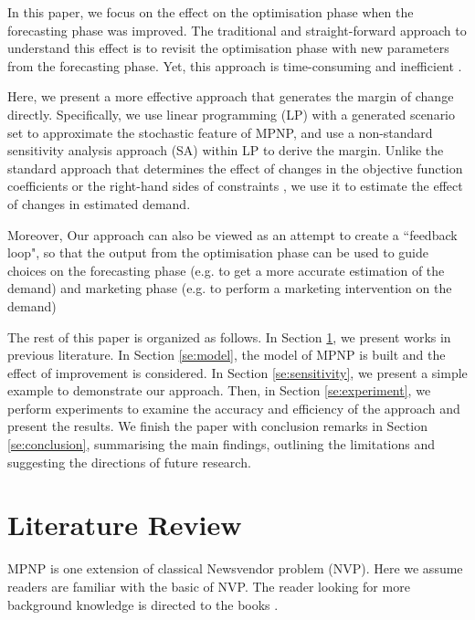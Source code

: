 \documentclass[a4paper,11pt]{article}
\begin{document}
In this paper, we focus on the effect on the optimisation phase when the forecasting phase was improved. The traditional and straight-forward approach to understand this effect is to revisit the optimisation phase with new parameters from the forecasting phase. Yet, this approach is time-consuming and inefficient \cite{BHMW08}.

Here, we present a more effective approach that generates the margin of change directly. Specifically, we use linear programming (LP) with a generated scenario set to approximate the stochastic feature of MPNP, and use a non-standard sensitivity analysis approach (SA) within LP to derive the margin. Unlike the standard approach that determines the effect of changes in the objective function coefficients or the right-hand sides of constraints \cite{DT06}, we use it to estimate the effect of changes in estimated demand. 

Moreover, Our approach can also be viewed as an attempt to create a ``feedback loop", so that the output from the optimisation phase can be used to guide choices on the forecasting phase (e.g. to get a more accurate estimation of the demand) and marketing phase (e.g. to perform a marketing intervention on the demand)

The rest of this paper is organized as follows. In Section \ref{se:literature}, we present works in previous literature. In Section \ref{se:model}, the model of MPNP is built and the effect of improvement is considered. In Section \ref{se:sensitivity}, we present a simple example to demonstrate our approach. Then, in Section \ref{se:experiment}, we perform experiments to examine the accuracy and efficiency of the approach and present the results. We finish the paper with conclusion remarks in Section \ref{se:conclusion}, summarising the main 
findings, outlining the limitations and suggesting the directions of future research.

\section{Literature Review}
\label{se:literature}
MPNP is one extension of classical Newsvendor problem (NVP). Here we assume readers are familiar with the basic of NVP. The reader looking for more background knowledge is directed to the books \cite{Ch12,Po02,SPP98}.
\end{document}
